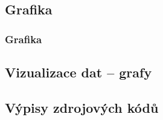 \subsection{Grafika}
\begin{frame}
	\frametitle{Grafika}
\end{frame}






\subsection{Vizualizace dat -- grafy}




\subsection{Výpisy zdrojových kódů}



\endinput
